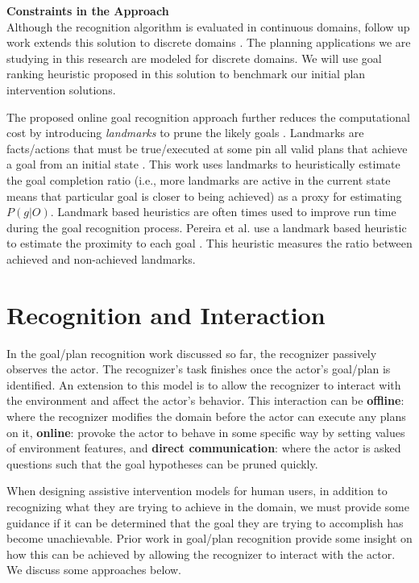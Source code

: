\noindent\textbf{Constraints in the Approach}\\
Although the recognition algorithm is evaluated in continuous domains, follow up work extends this solution to discrete domains \cite{vered2018goalrec}. The planning applications we are studying in this research are modeled for discrete domains. We will use goal ranking heuristic proposed in this solution to benchmark our initial plan intervention solutions.

The proposed online goal recognition approach further reduces the computational cost by introducing \textit{landmarks} to prune the likely goals \cite{vered2018goalrec}. 
Landmarks are facts/actions that must be true/executed at some pin all valid plans that achieve a goal from an initial state \cite{hoffman2004lm}. 
This work uses landmarks to heuristically estimate the goal completion ratio (i.e., more landmarks are active in the current state means that particular goal is closer to being achieved) as a proxy for estimating $P(g|O)$. Landmark based heuristics are often times used to improve run time during the goal recognition process. Pereira et al. use a landmark based heuristic to estimate the proximity to each goal \cite{pereira2017}. This heuristic measures the ratio between achieved and non-achieved landmarks.


\section{Recognition and Interaction}
In the goal/plan recognition  work discussed so far, the recognizer passively observes the actor. The recognizer's task finishes once the actor's goal/plan is identified. An extension to this model is to allow the recognizer to interact with the environment and affect the actor's behavior. This interaction can be \textbf{offline}: where the recognizer modifies the domain before the actor can execute any plans on it, \textbf{online}: provoke the actor to behave in some specific way by setting values of environment features, and \textbf{direct communication}: where the actor is asked questions such that the goal hypotheses can be pruned quickly. 

When designing assistive intervention models for human users, in addition to recognizing what they are trying to achieve in the domain, we must provide some guidance if it can be determined that the goal they are trying to accomplish has become unachievable. Prior work in goal/plan recognition provide some insight on how this can be achieved by allowing the recognizer to interact with the actor. We discuss some approaches below.

